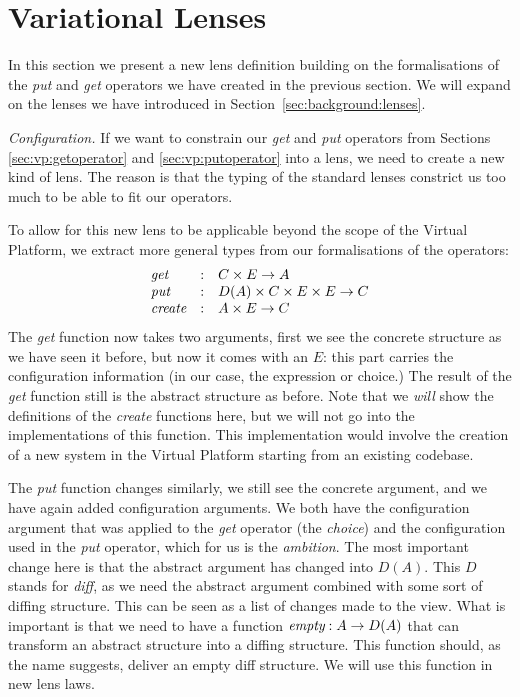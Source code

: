 \chapter{Variational Lenses}\label{sec:configlenses}
In this section we present a new lens definition building on the formalisations 
of the \emph{put} and \emph{get} operators we have created in the previous
section. We will expand on the lenses we have introduced in Section~\ref{sec:background:lenses}.

\noindent\emph{Configuration.}
If we want to constrain our \emph{get} and \emph{put} operators from
Sections \ref{sec:vp:getoperator} and \ref{sec:vp:putoperator} into a lens, we
need to create a new kind of lens. The reason is that the typing of the
standard lenses constrict us too much to be able to fit our
operators.

To allow for this new lens to be applicable beyond the scope of the Virtual
Platform, we extract more general types from our formalisations of the
operators:
\[
  \begin{array}{lll}
    \textit{get} & : & C \times E \rightarrow A \\
    \textit{put} & : & D(A) \times C \times E \times E \rightarrow C \\
    \textit{create} & : & A \times E \rightarrow C
  \end{array}
\]
The \emph{get} function now takes two arguments, first we see the concrete
structure as we have seen it before, but now it comes with an \(E\): this part
carries the configuration information (in our case, the expression or choice.)
The result of the \emph{get} function still is the abstract structure as before. Note
that we \emph{will} show the definitions of the \emph{create} functions here, 
but we will not go into the implementations of this function. This implementation
would involve the creation of a new system in the Virtual Platform starting from an
existing codebase.

The \emph{put} function changes similarly, we still see the concrete
argument, and we have again added configuration arguments. We both have the 
configuration argument that was applied to the \emph{get} operator (the
\emph{choice}) and the configuration used in the \emph{put} operator, which for
us is the \emph{ambition}. The most important change here is that the abstract
argument has changed into \(D(A)\). This \(D\) stands for \emph{diff}, as we
need the abstract argument combined with some sort of diffing structure. This
can be seen as a list of changes made to the view. What
is important is that we need to have a function
\(\textit{empty} : A \rightarrow D(A)\) that can transform an abstract
structure into a diffing structure. This function should, as the name suggests,
deliver an empty diff structure. We will use this function in new lens laws.

